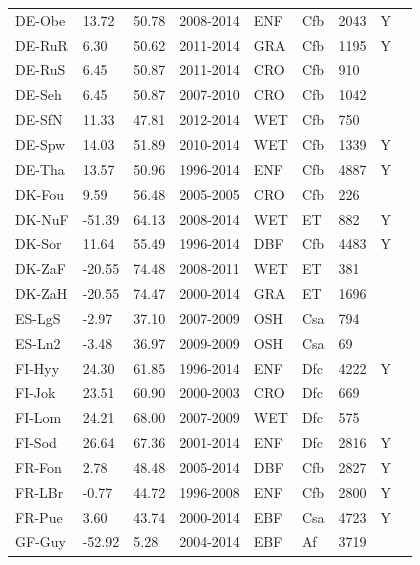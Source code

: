 \documentclass{myreport}
\begin{document}
\begin{longtable}{lllllllll}
  DE-Obe & 13.72 & 50.78 & 2008-2014 & ENF & Cfb & 2043 & Y & \cite{DE-Obe} \\ 
  DE-RuR & 6.30 & 50.62 & 2011-2014 & GRA & Cfb & 1195 & Y & \cite{DE-RuR} \\ 
  DE-RuS & 6.45 & 50.87 & 2011-2014 & CRO & Cfb & 910 &  & \cite{DE-RuS} \\ 
  DE-Seh & 6.45 & 50.87 & 2007-2010 & CRO & Cfb & 1042 &  & \cite{DE-Seh} \\ 
  DE-SfN & 11.33 & 47.81 & 2012-2014 & WET & Cfb & 750 &  & \cite{DE-SfN} \\ 
  DE-Spw & 14.03 & 51.89 & 2010-2014 & WET & Cfb & 1339 & Y & \cite{DE-Spw} \\ 
  DE-Tha & 13.57 & 50.96 & 1996-2014 & ENF & Cfb & 4887 & Y & \cite{DE-Tha} \\ 
  DK-Fou & 9.59 & 56.48 & 2005-2005 & CRO & Cfb & 226 &  & \cite{DK-Fou} \\ 
  DK-NuF & -51.39 & 64.13 & 2008-2014 & WET & ET & 882 & Y & \cite{DK-NuF} \\ 
  DK-Sor & 11.64 & 55.49 & 1996-2014 & DBF & Cfb & 4483 & Y & \cite{DK-Sor} \\ 
  DK-ZaF & -20.55 & 74.48 & 2008-2011 & WET & ET & 381 &  & \cite{DK-ZaF} \\ 
  DK-ZaH & -20.55 & 74.47 & 2000-2014 & GRA & ET & 1696 &  & \cite{DK-ZaH} \\ 
  ES-LgS & -2.97 & 37.10 & 2007-2009 & OSH & Csa & 794 &  & \cite{ES-LgS} \\ 
  ES-Ln2 & -3.48 & 36.97 & 2009-2009 & OSH & Csa &  69 &  & \cite{ES-Ln2} \\ 
  FI-Hyy & 24.30 & 61.85 & 1996-2014 & ENF & Dfc & 4222 & Y & \cite{FI-Hyy} \\ 
  FI-Jok & 23.51 & 60.90 & 2000-2003 & CRO & Dfc & 669 &  & \cite{FI-Jok} \\ 
  FI-Lom & 24.21 & 68.00 & 2007-2009 & WET & Dfc & 575 &  & \cite{FI-Lom} \\ 
  FI-Sod & 26.64 & 67.36 & 2001-2014 & ENF & Dfc & 2816 & Y & \cite{FI-Sod} \\ 
  FR-Fon & 2.78 & 48.48 & 2005-2014 & DBF & Cfb & 2827 & Y & \cite{FR-Fon} \\ 
  FR-LBr & -0.77 & 44.72 & 1996-2008 & ENF & Cfb & 2800 & Y & \cite{FR-LBr} \\ 
  FR-Pue & 3.60 & 43.74 & 2000-2014 & EBF & Csa & 4723 & Y & \cite{FR-Pue} \\ 
  GF-Guy & -52.92 & 5.28 & 2004-2014 & EBF & Af & 3719 &  & \cite{GF-Guy} \\ 

\end{longtable}
\end{document}
